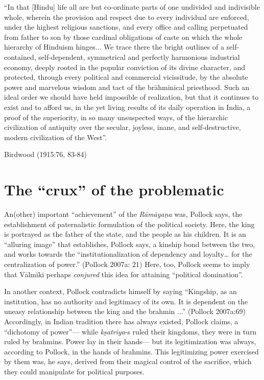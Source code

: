 \begin{myquote}
“In that [Hindu] life all are but co-ordinate parts of one undivided and indivisible whole, wherein the provision and respect due to every individual are enforced, under the highest religious sanctions, and every office and calling perpetuated from father to son by those cardinal obligations of caste on which the whole hierarchy of Hinduism hinges... We trace there the bright outlines of a self-contained, self-dependent, symmetrical and perfectly harmonious industrial economy, deeply rooted in the popular conviction of its divine character, and protected, through every political and commercial vicissitude, by the absolute power and marvelous wisdom and tact of the brāhminical priesthood. Such an ideal order we should have held impossible of realization, but that it continues to exist and to afford us, in the yet living results of its daily operation in India, a proof of the superiority, in so many unsuspected ways, of the hierarchic civilization of antiquity over the secular, joyless, inane, and self-destructive, modern civilization of the West”.

Birdwood (1915:76, 83-84)
\end{myquote}

\section{The “crux” of the problematic}\label{sec1.4}

An(other) important “achievement” of the {\sl Rāmāyaṇa} was, Pollock says, the establishment of paternalistic formulation of the political society. Here, the king is portrayed as the father of the state, and the people as his children. It is an “alluring image” that establishes, Pollock says, a kinship bond between the two, and works towards the “institutionalization of dependency and loyalty… for the centralization of power.” (Pollock 2007a: 21)  Here, too, Pollock seems to imply that Vālmīki perhaps {\sl conjured} this idea for attaining “political domination”. 

In another context, Pollock contradicts himself by saying “Kingship, as an institution, has no authority and legitimacy of its own. It is dependent on the uneasy relationship between the king and the brahmin ...” (Pollock 2007a:69) Accordingly, in Indian tradition there has always existed, Pollock claims, a “dichotomy of power”--- while {\sl kṣatriya}-s ruled their kingdoms, they were in turn ruled by brahmins.  Power lay in their hands--- but its legitimization was always, according to Pollock, in the hands of brahmins. This legitimizing power exercised by them was, he says, derived from their magical control of the sacrifice, which they could manipulate for political purposes.

